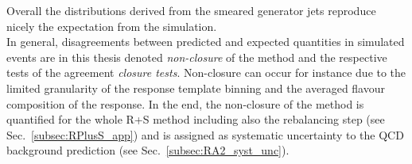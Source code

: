 Overall the distributions derived from the smeared generator jets reproduce nicely the expectation from the simulation. \\
In general, disagreements between predicted and expected quantities in simulated events are in this thesis denoted \textit{non-closure} of the method and the respective tests of the agreement \textit{closure tests}. Non-closure can occur for instance due to the limited granularity of the response template binning and the averaged flavour composition of the response. In the end, the non-closure of the method is quantified for the whole R+S method including also the rebalancing step (see Sec.~\ref{subsec:RPlusS_app}) and is assigned as systematic uncertainty to the QCD background prediction (see Sec.~\ref{subsec:RA2_syst_unc}). 


